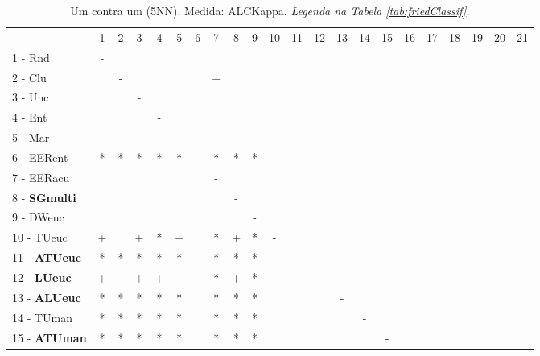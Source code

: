 \begin{table}[h]
\caption{Um contra um (5NN). Medida: ALCKappa. \textit{Legenda na Tabela \ref{tab:friedClassif}.}}
\begin{center}\begin{tabular}{lcc|cc|cc|cc|cc|cc|cc|cc|cc|cc|c}
 			& 1 & 2 & 3 & 4 & 5 & 6 & 7 & 8 & 9 & 10 & 11 & 12 & 13 & 14 & 15 & 16 & 17 & 18 & 19 & 20 & 21\\
1 - Rnd  	& - &   &   &   &   &   &   &   &   &   &   &   &   &   &   &   &   &   &   &   &   \\
2 - Clu  	&   & - &   &   &   &   & + &   &   &   &   &   &   &   &   &   &   &   &   &   &   \\ \hline
3 - Unc  	&   &   & - &   &   &   &   &   &   &   &   &   &   &   &   &   &   &   &   &   &   \\
4 - Ent  	&   &   &   & - &   &   &   &   &   &   &   &   &   &   &   &   &   &   &   &   &   \\ \hline
5 - Mar  	&   &   &   &   & - &   &   &   &   &   &   &   &   &   &   &   &   &   &   &   &   \\
6 - EERent	& * & * & * & * & * & - & * & * & * &   &   &   &   &   &   &   &   &   &   &   &   \\ \hline
7 - EERacu	&   &   &   &   &   &   & - &   &   &   &   &   &   &   &   &   &   &   &   &   &   \\
8 - \textbf{SGmulti}	&   &   &   &   &   &   &   & - &   &   &   &   &   &   &   &   &   &   &   &   &   \\ \hline
9 - DWeuc	&   &   &   &   &   &   &   &   & - &   &   &   &   &   &   &   &   &   &   &   &   \\
10 - TUeuc	& + &   & + & * & + &   & * & + & * & - &   &   &   &   &   &   &   &   &   &   &   \\ \hline
11 - \textbf{ATUeuc}	& * & * & * & * & * &   & * & * & * &   & - &   &   &   &   &   &   &   &   &   &   \\
12 - \textbf{LUeuc}	& + &   & + & + & + &   & * & + & * &   &   & - &   &   &   &   &   &   &   &   &   \\ \hline
13 - \textbf{ALUeuc}	& * & * & * & * & * &   & * & * & * &   &   &   & - &   &   &   &   &   &   &   &   \\
14 - TUman	& * & * & * & * & * &   & * & * & * &   &   &   &   & - &   &   &   &   &   &   &   \\ \hline
15 - \textbf{ATUman}	& * & * & * & * & * &   & * & * & * &   &   &   &   &   & - &   &   &   &   &   &   \\

\end{tabular}
\end{center}
\end{table}
